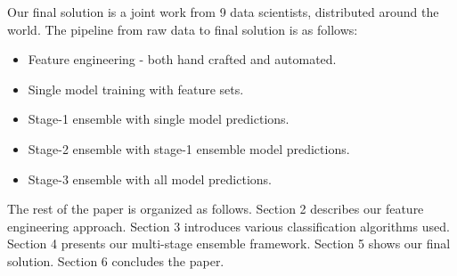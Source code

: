 Our final solution is a joint work from 9 data scientists, distributed around the world.
The pipeline from raw data to final solution is as follows:
\begin{itemize}
  \setlength\itemsep{0em}
  \item Feature engineering - both hand crafted and automated.
  \item Single model training with feature sets.
  \item Stage-1 ensemble with single model predictions.
  \item Stage-2 ensemble with stage-1 ensemble model predictions.
  \item Stage-3 ensemble with all model predictions.
\end{itemize}

The rest of the paper is organized as follows. Section 2 describes our feature engineering approach. Section 3 introduces various classification algorithms used. Section 4 presents our multi-stage ensemble framework. Section 5 shows our final solution. Section 6 concludes the paper.
